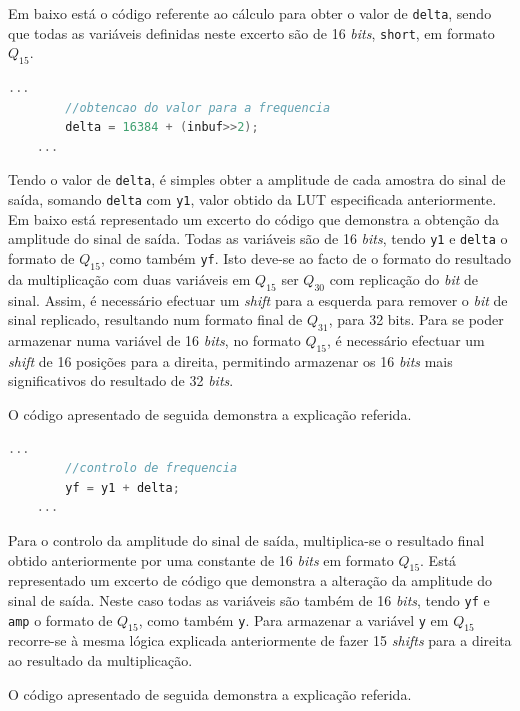 \documentclass[11pt]{article}
\numberwithin{equation}{section}
\begin{document}
Em baixo está o código referente ao cálculo para obter o valor de \texttt{delta}, sendo que todas as variáveis definidas neste excerto são de 16 \textit{bits}, \texttt{short}, em formato $Q_{15}$.

\begin{lstlisting}[language=C]
	...	
		//obtencao do valor para a frequencia		
		delta = 16384 + (inbuf>>2); 
	...
\end{lstlisting}

Tendo o valor de \texttt{delta}, é simples obter a amplitude de cada amostra do sinal de saída, somando  \texttt{delta} com \texttt{y1}, valor obtido da LUT especificada anteriormente. Em baixo está representado um excerto do código que demonstra a obtenção da amplitude do sinal de saída. Todas as variáveis são de 16 \textit{bits}, tendo \texttt{y1} e \texttt{delta} o formato de $Q_{15}$, como também \texttt{yf}. Isto deve-se ao facto de o formato do resultado da multiplicação com duas variáveis em $Q_{15}$ ser $Q_{30}$ com replicação do \textit{bit} de sinal. Assim, é necessário efectuar um \textit{shift} para a esquerda para remover o \textit{bit} de sinal replicado, resultando num formato final de $Q_{31}$, para 32 bits. Para se poder armazenar numa variável de 16 \textit{bits}, no formato $Q_{15}$, é necessário efectuar um \textit{shift} de 16 posições para a direita, permitindo armazenar os 16 \textit{bits} mais significativos do resultado de 32 \textit{bits}.


O código apresentado de seguida demonstra a explicação referida.

\begin{lstlisting}[language=C]
	...
		//controlo de frequencia
		yf = y1 + delta;
	...
\end{lstlisting}


Para o controlo da amplitude do sinal de saída, multiplica-se o resultado final obtido anteriormente por uma constante de 16 \textit{bits} em formato $Q_{15}$. Está representado um excerto de código que demonstra a alteração da amplitude do sinal de saída. Neste caso todas as variáveis são também de 16 \textit{bits}, tendo \texttt{yf} e \texttt{amp} o formato de $Q_{15}$, como também \texttt{y}. Para armazenar a variável \texttt{y} em $Q_{15}$ recorre-se à mesma lógica explicada anteriormente de fazer 15 \textit{shifts} para a direita ao resultado da multiplicação.

O código apresentado de seguida demonstra a explicação referida.
\end{document}

